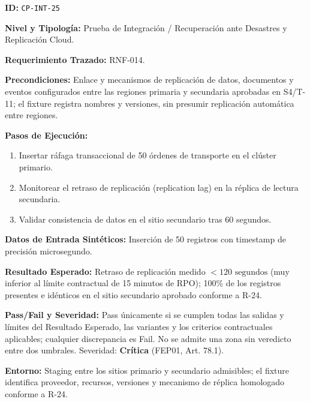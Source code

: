 \par\noindent \textbf{ID:} \texttt{CP-\allowbreak{}INT-\allowbreak{}25}\par
\par\noindent \textbf{Nivel y Tipología:} Prueba de Integración / Recuperación ante Desastres y Replicación Cloud.\par
\par\noindent \textbf{Requerimiento Trazado:} RNF-014.\par
\par\noindent \textbf{Precondiciones:} Enlace y mecanismos de replicación de datos, documentos y eventos configurados entre las regiones primaria y secundaria aprobadas en S4/T-11; el fixture registra nombres y versiones, sin presumir replicación automática entre regiones.\par
\par\noindent \textbf{Pasos de Ejecución:}\par
\begin{enumerate}
\item Insertar ráfaga transaccional de 50 órdenes de transporte en el clúster primario.
\item Monitorear el retraso de replicación (replication lag) en la réplica de lectura secundaria.
\item Validar consistencia de datos en el sitio secundario tras 60 segundos.
\end{enumerate}

\par\noindent \textbf{Datos de Entrada Sintéticos:} Inserción de 50 registros con timestamp de precisión microsegundo.\par
\par\noindent \textbf{Resultado Esperado:} Retraso de replicación medido $< 120\text{ segundos}$ (muy inferior al límite contractual de 15 minutos de RPO); 100\% de los registros presentes e idénticos en el sitio secundario aprobado conforme a R-24.\par
\par\noindent \textbf{Pass/Fail y Severidad:} Pass únicamente si se cumplen todas las salidas y límites del Resultado Esperado, las variantes y los criterios contractuales aplicables; cualquier discrepancia es Fail. No se admite una zona sin veredicto entre dos umbrales. Severidad: \textbf{Crítica} (FEP01, Art. 78.1).\par
\par\noindent \textbf{Entorno:} Staging entre los sitios primario y secundario admisibles; el fixture identifica proveedor, recursos, versiones y mecanismo de réplica homologado conforme a R-24.\par

